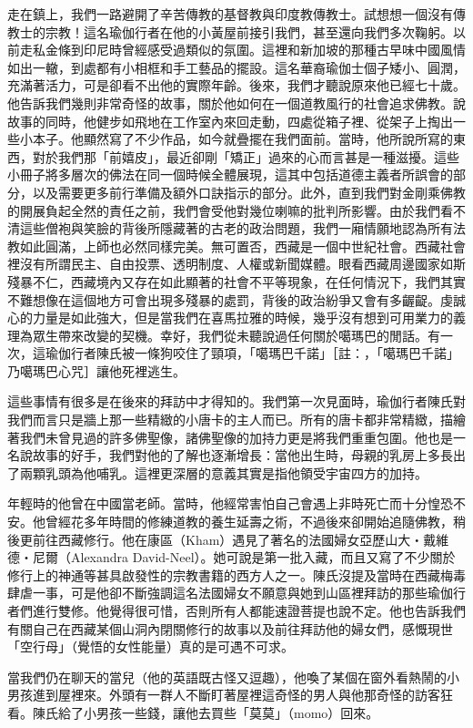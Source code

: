 走在鎮上，我們一路避開了辛苦傳教的基督教與印度教傳教士。試想想一個沒有傳教士的宗教！這名瑜伽行者在他的小黃屋前接引我們，甚至還向我們多次鞠躬。以前走私金條到印尼時曾經感受過類似的氛圍。這裡和新加坡的那種古早味中國風情如出一轍，到處都有小相框和手工藝品的擺設。這名華裔瑜伽士個子矮小、圓潤，充滿著活力，可是卻看不出他的實際年齡。後來，我們才聽說原來他已經七十歲。他告訴我們幾則非常奇怪的故事，關於他如何在一個道教風行的社會追求佛教。說故事的同時，他健步如飛地在工作室內來回走動，四處從箱子裡、從架子上掏出一些小本子。他顯然寫了不少作品，如今就疊擺在我們面前。當時，他所說所寫的東西，對於我們那「前嬉皮」，最近卻剛「矯正」過來的心而言甚是一種滋擾。這些小冊子將多層次的佛法在同一個時候全體展現，這其中包括道德主義者所誤會的部分，以及需要更多前行準備及額外口訣指示的部分。此外，直到我們對金剛乘佛教的開展負起全然的責任之前，我們會受他對幾位喇嘛的批判所影響。由於我們看不清這些僧袍與笑臉的背後所隱藏著的古老的政治問題，我們一廂情願地認為所有法教如此圓滿，上師也必然同樣完美。無可置否，西藏是一個中世紀社會。西藏社會裡沒有所謂民主、自由投票、透明制度、人權或新聞媒體。眼看西藏周邊國家如斯殘暴不仁，西藏境內又存在如此顯著的社會不平等現象，在任何情況下，我們其實不難想像在這個地方可會出現多殘暴的處罰，背後的政治紛爭又會有多齷齪。虔誠心的力量是如此強大，但是當我們在喜馬拉雅的時候，幾乎沒有想到可用業力的義理為眾生帶來改變的契機。幸好，我們從未聽說過任何關於噶瑪巴的閒話。有一次，這瑜伽行者陳氏被一條狗咬住了頸項，「噶瑪巴千諾」［註：，「噶瑪巴千諾」乃噶瑪巴心咒］讓他死裡逃生。

這些事情有很多是在後來的拜訪中才得知的。我們第一次見面時，瑜伽行者陳氏對我們而言只是牆上那一些精緻的小唐卡的主人而已。所有的唐卡都非常精緻，描繪著我們未曾見過的許多佛聖像，諸佛聖像的加持力更是將我們重重包圍。他也是一名說故事的好手，我們對他的了解也逐漸增長：當他出生時，母親的乳房上多長出了兩顆乳頭為他哺乳。這裡更深層的意義其實是指他領受宇宙四方的加持。

年輕時的他曾在中國當老師。當時，他經常害怕自己會遇上非時死亡而十分惶恐不安。他曾經花多年時間的修練道教的養生延壽之術，不過後來卻開始追隨佛教，稍後更前往西藏修行。他在康區（Kham）遇見了著名的法國婦女亞歷山大‧戴維德‧尼爾（Alexandra
David-Neel）。她可說是第一批入藏，而且又寫了不少關於修行上的神通等甚具啟發性的宗教書籍的西方人之一。陳氏沒提及當時在西藏梅毒肆虐一事，可是他卻不斷強調這名法國婦女不願意與她到山區裡拜訪的那些瑜伽行者們進行雙修。他覺得很可惜，否則所有人都能速證菩提也說不定。他也告訴我們有關自己在西藏某個山洞內閉關修行的故事以及前往拜訪他的婦女們，感慨現世「空行母」（覺悟的女性能量）真的是可遇不可求。

當我們仍在聊天的當兒（他的英語既古怪又逗趣），他喚了某個在窗外看熱鬧的小男孩進到屋裡來。外頭有一群人不斷盯著屋裡這奇怪的男人與他那奇怪的訪客狂看。陳氏給了小男孩一些錢，讓他去買些「莫莫」（momo）回來。

